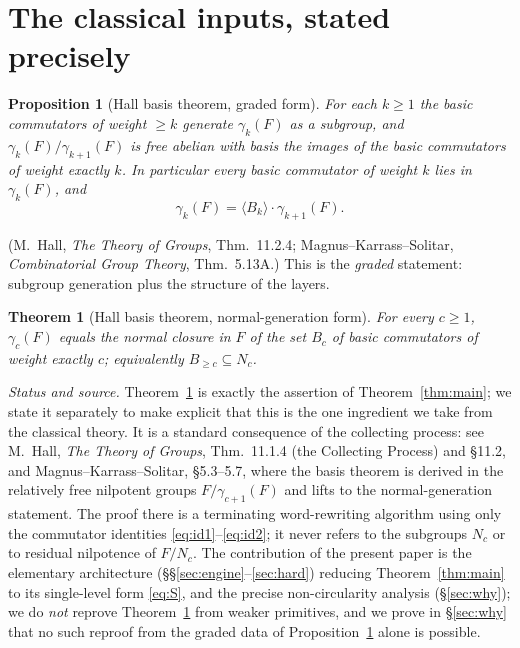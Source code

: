 \documentclass{amsart}
\newtheorem{theorem}{Theorem}
\newtheorem{proposition}{Proposition}
\theoremstyle{definition}
\theoremstyle{remark}
\begin{document}
\section{The classical inputs, stated precisely}\label{sec:input}

\begin{proposition}[Hall basis theorem, graded form]\label{prop:hall}
For each $k\ge 1$ the basic commutators of weight $\ge k$ generate $\gamma_k(F)$
\emph{as a subgroup}, and $\gamma_k(F)/\gamma_{k+1}(F)$ is free abelian with basis
the images of the basic commutators of weight exactly $k$. In particular every basic
commutator of weight $k$ lies in $\gamma_k(F)$, and
\begin{equation}\label{eq:hall-decomp}
\gamma_k(F)=\langle B_k\rangle\cdot\gamma_{k+1}(F).
\end{equation}
\end{proposition}

\noindent(M.~Hall, \emph{The Theory of Groups}, Thm.~11.2.4;
Magnus--Karrass--Solitar, \emph{Combinatorial Group Theory}, Thm.~5.13A.) This is
the \emph{graded} statement: subgroup generation plus the structure of the layers.

\begin{theorem}[Hall basis theorem, normal-generation form]\label{thm:nc}
For every $c\ge1$, $\gamma_c(F)$ equals the normal closure in $F$ of the set $B_c$
of basic commutators of weight exactly $c$; equivalently $B_{\ge c}\subseteq N_c$.
\end{theorem}

\noindent\emph{Status and source.} Theorem~\ref{thm:nc} is exactly the assertion of
Theorem~\ref{thm:main}; we state it separately to make explicit that this is the one
ingredient we take from the classical theory. It is a standard consequence of the
collecting process: see M.~Hall, \emph{The Theory of Groups}, Thm.~11.1.4 (the
Collecting Process) and \S11.2, and Magnus--Karrass--Solitar, \S5.3--5.7, where the
basis theorem is derived in the relatively free nilpotent groups
$F/\gamma_{c+1}(F)$ and lifts to the normal-generation statement. The proof there is
a terminating word-rewriting algorithm using only the commutator identities
\eqref{eq:id1}--\eqref{eq:id2}; it never refers to the subgroups $N_c$ or to
residual nilpotence of $F/N_c$. The contribution of the present paper is the
elementary architecture (\S\S\ref{sec:engine}--\ref{sec:hard}) reducing
Theorem~\ref{thm:main} to its single-level form \eqref{eq:S}, and the precise
non-circularity analysis (\S\ref{sec:why}); we do \emph{not} reprove
Theorem~\ref{thm:nc} from weaker primitives, and we prove in \S\ref{sec:why} that no
such reproof from the graded data of Proposition~\ref{prop:hall} alone is possible.
\end{document}
